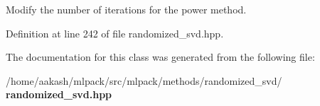 Modify the number of iterations for the power method. 



Definition at line 242 of file randomized\+\_\+svd.\+hpp.



The documentation for this class was generated from the following file\+:\begin{DoxyCompactItemize}
\item 
/home/aakash/mlpack/src/mlpack/methods/randomized\+\_\+svd/\textbf{ randomized\+\_\+svd.\+hpp}\end{DoxyCompactItemize}
